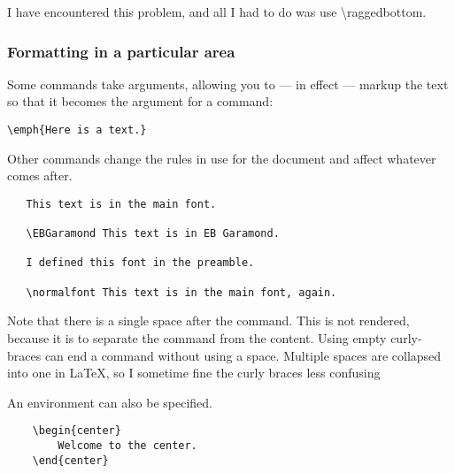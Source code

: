 \documentclass[11pt, oneside]{memoir}
\begin{document}
I have encountered this problem, and all I had to do was use \textbackslash \mbox{raggedbottom}.

\subsubsection{Formatting in a particular area}

Some commands take arguments, allowing you to — in effect — markup the text so that it becomes the argument for a command:

\begin{verbatim}
\emph{Here is a text.}
\end{verbatim}

Other commands change the rules in use for the document and affect whatever comes after.

\begin{verbatim}
   This text is in the main font. 
   
   \EBGaramond This text is in EB Garamond. 
   
   I defined this font in the preamble.
   
   \normalfont This text is in the main font, again.
\end{verbatim}

Note that there is a single space after the command. This is not rendered, because it is to separate the command from the content. Using empty curly-braces can end a command without using a space. Multiple spaces are collapsed into one in LaTeX, so I sometime fine the curly braces less confusing

An environment can also be specified.

\begin{verbatim}
    \begin{center}
        Welcome to the center.
    \end{center}
\end{verbatim}


\end{document}
